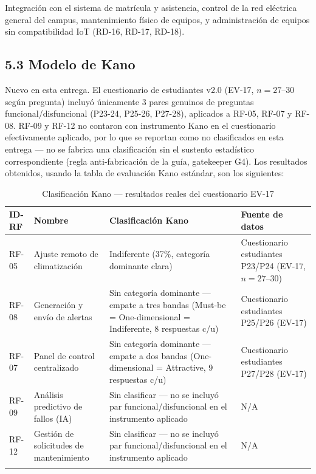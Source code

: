 Integración con el sistema de matrícula y asistencia, control de la red eléctrica general del campus, mantenimiento físico de equipos, y administración de equipos sin compatibilidad IoT (RD-16, RD-17, RD-18).


\subsection*{5.3 Modelo de Kano}


Nuevo en esta entrega. El cuestionario de estudiantes v2.0 (EV-17, $n=27$--$30$ según pregunta) incluyó únicamente 3 pares genuinos de preguntas funcional/disfuncional (P23-24, P25-26, P27-28), aplicados a RF-05, RF-07 y RF-08. RF-09 y RF-12 no contaron con instrumento Kano en el cuestionario efectivamente aplicado, por lo que se reportan como no clasificados en esta entrega --- no se fabrica una clasificación sin el sustento estadístico correspondiente (regla anti-fabricación de la guía, gatekeeper G4). Los resultados obtenidos, usando la tabla de evaluación Kano estándar, son los siguientes:


\begingroup
\small
\begin{longtable}{|p{3.9cm}|p{3.9cm}|p{3.9cm}|p{3.9cm}|}
\hline
ID-RF & Nombre & Clasificación Kano & Fuente de datos \\ \hline
RF-05 & Ajuste remoto de climatización & Indiferente (37\%, categoría dominante clara) & Cuestionario estudiantes P23/P24 (EV-17, $n=27$--$30$) \\ \hline
RF-08 & Generación y envío de alertas & Sin categoría dominante --- empate a tres bandas (Must-be = One-dimensional = Indiferente, 8 respuestas c/u) & Cuestionario estudiantes P25/P26 (EV-17) \\ \hline
RF-07 & Panel de control centralizado & Sin categoría dominante --- empate a dos bandas (One-dimensional = Attractive, 9 respuestas c/u) & Cuestionario estudiantes P27/P28 (EV-17) \\ \hline
RF-09 & Análisis predictivo de fallos (IA) & Sin clasificar --- no se incluyó par funcional/disfuncional en el instrumento aplicado & N/A \\ \hline
RF-12 & Gestión de solicitudes de mantenimiento & Sin clasificar --- no se incluyó par funcional/disfuncional en el instrumento aplicado & N/A \\ \hline
\caption{Clasificación Kano --- resultados reales del cuestionario EV-17}
\end{longtable}
\endgroup

